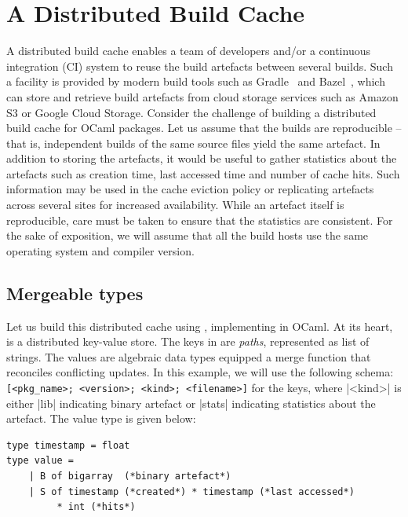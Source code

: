 \section{A Distributed Build Cache}
\label{sec:motivation}

A distributed build cache enables a team of developers and/or a continuous
integration (CI) system to reuse the build artefacts between several builds.
Such a facility is provided by modern build tools such as Gradle~\cite{Gradle}
and Bazel~\cite{Bazel}, which can store and retrieve build artefacts from cloud
storage services such as Amazon S3 or Google Cloud Storage. Consider the
challenge of building a distributed build cache for OCaml packages. Let us
assume that the builds are reproducible -- that is, independent builds of the same source
files yield the same artefact. In addition to storing the artefacts, it would
be useful to gather statistics about the artefacts such as creation time, last
accessed time and number of cache hits. Such information may be used in the
cache eviction policy or replicating artefacts across several sites for
increased availability. While an artefact itself is reproducible, care must be
taken to ensure that the statistics are consistent. For the sake of exposition,
we will assume that all the build hosts use the same operating system and
compiler version.

\subsection{Mergeable types}

Let us build this distributed cache using \name, implementing in OCaml. At its
heart, \name is a distributed key-value store. The keys in \name are
\emph{paths}, represented as list of strings. The values are algebraic data
types equipped a merge function that reconciles conflicting updates. In this
example, we will use the following schema:
\lstinline[breaklines=true]{[<pkg_name>; <version>; <kind>; <filename>]} for
the keys, where |<kind>| is either |lib| indicating binary artefact or
|stats| indicating statistics about the artefact. The value type is given
below:
\begin{lstlisting}[language=caml]
type timestamp = float
type value =
	| B of bigarray  (*binary artefact*)
	| S of timestamp (*created*) * timestamp (*last accessed*)
	     * int (*hits*)
\end{lstlisting}

